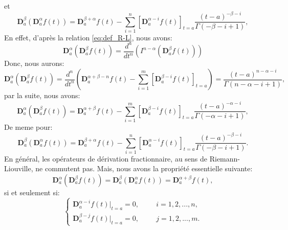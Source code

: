 et
\begin{equation}
        \textbf{D}_a^{\beta} \left(\textbf{D}_a^{\alpha} f(t) \right) = \mathbf{D}_a^{\beta+\alpha}f(t) -\sum_{i=1}^n [\textbf{D}_a^{\alpha -i} f(t)]_{t=a} \frac{(t-a)^{-\beta-i}}{\Gamma(-\beta -i +1)},
\end{equation}
En effet, d'après la relation \ref{eq:def_R-L}, nous avons:
\begin{equation*}
    \textbf{D}_a^{\alpha} \left(\textbf{D}_a^{\beta} f(t)\right) = \frac{d^n}{dt^n} \left(I^{n-\alpha}(\textbf{D}_a^{\beta} f(t))\right)
\end{equation*}
Donc, nous aurons:
\begin{equation*}
    \textbf{D}_a^{\alpha}(\textbf{D}_a^{\beta} f(t)) = \frac{d^n}{dt^n} \left(\textbf{D}_a^{\alpha+\beta-n} f(t) -\sum_{i=1}^m [\textbf{D}_a^{\beta -i} f(t)]_ {t=a} \right) = \frac{(t-a)^{n-\alpha-i}}{\Gamma(n-\alpha-i+1)},
\end{equation*}
par la suite, nous avons:
\begin{equation*}
    \textbf{D}_a^{\alpha}(\textbf{D}_a^{\beta} f(t))=\textbf{D}_a^{\alpha+\beta} f(t) -\sum_{i=1}^m[\textbf{D}_a^{\beta-i}f(t)]_{t=a} \frac{(t-a)^{-\alpha-i}}{\Gamma(-\alpha-i+1)},
\end{equation*}
De meme pour:
\begin{equation*}
    \textbf{D}_a^{\beta}(\textbf{D}_a^{\alpha} f(t)) = \textbf{D}_a^{\beta+\alpha} f(t) -\sum_{i=1}^n[\textbf{D}_a^{\alpha-i}f(t)]_{t=a} \frac{(t-a)^{-\beta-i}}{\Gamma(-\beta -i+1)}.
\end{equation*}
En général, les opérateurs de dérivation fractionnaire, au sens de Riemann-Liouville, ne commutent pas. Mais, nous avons la propriété essentielle suivante:
\begin{equation}
    \textbf{D}_a^{\alpha}\left(\textbf{D}_a^{\beta} f(t)\right) = \textbf{D}_a^{\beta} \left( \textbf{D}_a^{\alpha} f(t)\right) = \textbf{D}_a^{\alpha+\beta}f(t),
\end{equation}
si et seulement si: \\
\begin{equation}
    \begin{cases}
        \textbf{D}_a^{\alpha -i} f(t)|_{t=a} =0, \hspace{1cm} i=1,2,...,n,\\
        \textbf{D}_a^{\beta -j} f(t)|_{t=a}=0, \hspace{1cm} j=1,2,...,m.
    \end{cases}    
\end{equation}
